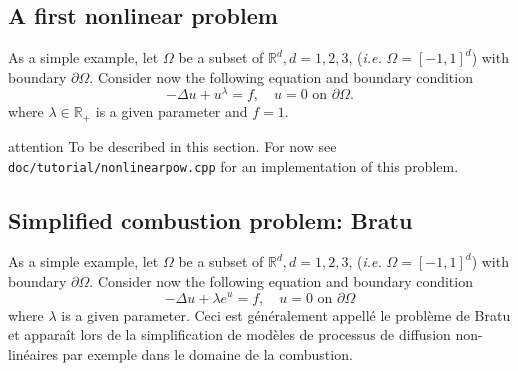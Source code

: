 \documentclass[a4paper]{book}
\newcommand{\ficnota}{attention}
\newenvironment{nota}{%
  \begin{pictonote}{\ficnota}}{\end{pictonote}}
\begin{document}
\subsection{A first nonlinear problem}
\label{sec:bratu}

As a simple example, let $\Omega$ be a subset of $\mathbb{R}^d, d=1,2,3$,
(\emph{i.e.} $\Omega=[-1,1]^d$) with boundary $\partial
\Omega$. Consider now the following equation and boundary condition
\begin{equation}
  \label{eq:29}
  -\Delta u + u^\lambda = f,\quad u = 0 \text{ on } \partial \Omega.
\end{equation}
where $\lambda \in \mathbb{R_+}$ is a given parameter and $f=1$.


\begin{nota}
  To be described in this section. For now see
  \texttt{doc/tutorial/nonlinearpow.cpp} for an implementation of this
  problem.
\end{nota}

\subsection{Simplified combustion problem: Bratu}
\label{sec:bratu}

As a simple example, let $\Omega$ be a subset of $\mathbb{R}^d, d=1,2,3$,
(\emph{i.e.} $\Omega=[-1,1]^d$) with boundary $\partial
\Omega$. Consider now the following equation and boundary condition
\begin{equation}
  \label{eq:29}
  -\Delta u + \lambda e^u = f,\quad u = 0 \text{ on } \partial \Omega
\end{equation}
where $\lambda$ is a given parameter. Ceci est généralement appellé le
problème de Bratu et apparaît lors de la simplification de modèles de
processus de diffusion non-linéaires par exemple dans le domaine de la
combustion.
\end{document}
